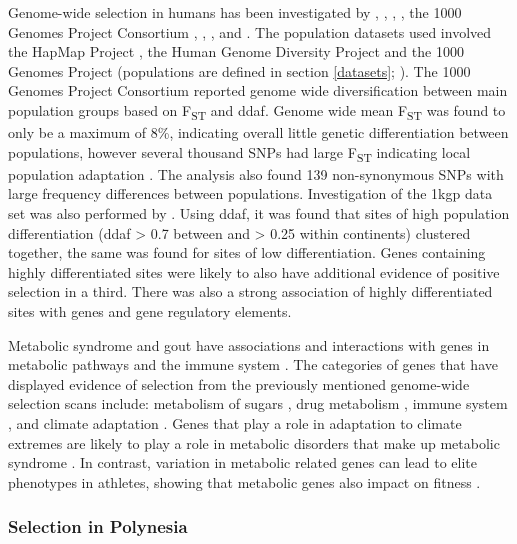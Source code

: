 \documentclass[twoside,openright]{report}
\begin{document}
Genome-wide selection in humans has been investigated by
\citet{sabeti2006positive}, \citet{voight2006map}, \citet{Hancock2008},
\citet{pickrell2009signals}, the 1000 Genomes Project Consortium
\citep{1KGP2010, 1KGP2012, 1KGP2015snp}, \citet{Grossman2010},
\citet{Colonna2014}, and \citet{Mallick2016}. The population datasets
used involved the HapMap Project \citep{Hapmap2005}, the Human Genome
Diversity Project \citep{Cann2002, Rosenburg2002} and the 1000 Genomes
Project (populations are defined in section \ref{datasets};
\citet{1KGP2010}). The 1000 Genomes Project Consortium
\citep{1KGP2010, 1KGP2012, 1KGP2015snp} reported genome wide
diversification between main population groups based on
F\textsubscript{ST} and \gls{ddaf}. Genome wide mean F\textsubscript{ST}
was found to only be a maximum of 8\%, indicating overall little genetic
differentiation between populations, however several thousand SNPs had
large F\textsubscript{ST} indicating local population adaptation
\citep{1KGP2010}. The analysis also found 139 non-synonymous SNPs with
large frequency differences between populations. Investigation of the
\gls{1kgp} data set was also performed by \citet{Colonna2014}. Using
\gls{ddaf}, it was found that sites of high population differentiation
(\gls{ddaf} \textgreater{} 0.7 between and \textgreater{} 0.25 within
continents) clustered together, the same was found for sites of low
differentiation. Genes containing highly differentiated sites were
likely to also have additional evidence of positive selection in a
third. There was also a strong association of highly differentiated
sites with genes and gene regulatory elements.

Metabolic syndrome and gout have associations and interactions with
genes in metabolic pathways and the immune system \citep{Osborn2012}.
The categories of genes that have displayed evidence of selection from
the previously mentioned genome-wide selection scans include: metabolism
of sugars \citep{voight2006map, tang2007new}, drug metabolism
\citep{tang2007new}, immune system \citep{tang2007new, Grossman2010},
and climate adaptation \citep{Hancock2008}. Genes that play a role in
adaptation to climate extremes are likely to play a role in metabolic
disorders that make up metabolic syndrome \citep{Hancock2008}. In
contrast, variation in metabolic related genes can lead to elite
phenotypes in athletes, showing that metabolic genes also impact on
fitness \citep{Ahmetov2009a}.

\subsubsection{Selection in Polynesia}\label{selection-in-polynesia}
\end{document}

